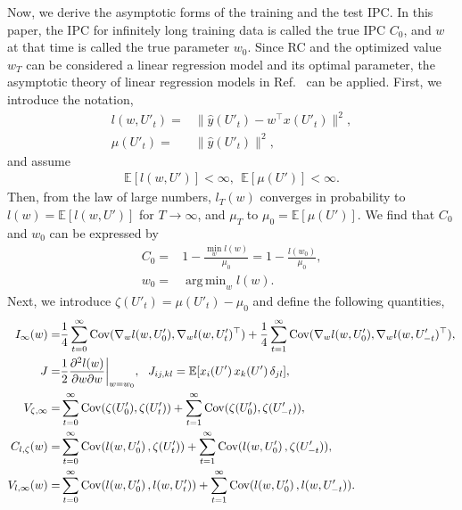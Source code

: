 \documentclass{article}
\DeclareMathOperator*{\argmin}{arg\,min}
\begin{document}
Now, we derive the asymptotic forms of the training and the test IPC. 
In this paper, the IPC for infinitely long training data is called the true IPC $C_0$, and $w$ at that time is called the true parameter $w_0$. 
Since RC and the optimized value $w_T$ can be considered a linear regression model and its optimal parameter, the asymptotic theory of linear regression models in Ref.~\cite{white2014asymptotic} can be applied. 
First, we introduce the notation, 
\begin{align} 
 l(w, U'_t) =& \|\hat{y}(U'_t) - w^\top x(U'_t)\|^2, \\
 \mu(U'_t) =& \|\hat{y}(U'_t)\|^2, 
\end{align}
and assume 
\begin{align}
 \mathbb{E}[l(w, U')] < \infty, \ \ 
 \mathbb{E}[\mu(U')] < \infty. 
\end{align}
Then, from the law of large numbers, $l_T(w)$ converges in probability to $l(w) = \mathbb{E}[l(w, U')]$ for $T \to \infty$, and $\mu_T$ to $\mu_0 = \mathbb{E}[\mu(U')]$. 
We find that $C_0$ and $w_0$ can be expressed by 
\begin{align}
 C_0 =& 1 - \frac{\min_w l(w)}{\mu_0} = 1 - \frac{l(w_0)}{\mu_0},
 \label{eq:true_IPC} \\
 w_0 =& \argmin_w l(w).
 \label{eq:true_parameter}
\end{align}
Next, we introduce $\zeta(U'_t) = \mu(U'_t) - \mu_0$ and define the following quantities, 
\begin{align}
 I_\infty(w) 
 =& \frac{1}{4} \sum_{t=0}^\infty {\rm Cov}(\nabla_w l(w, U'_0), \nabla_w l(w, U'_t)^\top)
 + \frac{1}{4}\sum_{t=1}^\infty {\rm Cov}(\nabla_w l(w, U'_0), \nabla_w l(w, U'_{-t})^\top), 
  \label{def:I_inf} \\ 
 J =& \frac{1}{2} \frac{\partial^2 l(w)}{\partial w \partial w}\biggr|_{w = w_0}, \ \ 
 J_{ij, kl} = \mathbb{E}[x_i(U') \, x_k(U') \, \delta_{jl}], 
  \label{def:J} \\
 V_{\zeta, \infty} 
  =& \sum_{t=0}^\infty {\rm Cov}(\zeta(U'_0), \zeta(U'_t)) 
  + \sum_{t=1}^\infty {\rm Cov}(\zeta(U'_0), \zeta(U'_{-t})), 
  \label{def:V_mu_inf} \\
 C_{l, \zeta}(w) 
  =& \sum_{t=0}^\infty {\rm Cov}(l(w, U'_0) \, , \zeta(U'_t)) 
  + \sum_{t=1}^\infty {\rm Cov}(l(w, U'_0) \, , \zeta(U'_{-t})), 
  \label{def:l_zeta_cov} \\ 
 V_{l, \infty}(w) 
  =& \sum_{t=0}^\infty {\rm Cov}(l(w, U'_0) \, , l(w, U'_t))
  + \sum_{t=1}^\infty {\rm Cov}(l(w, U'_0) \, , l(w, U'_{-t})). 
  \label{def:l_auto_cov}
\end{align}
\end{document}
